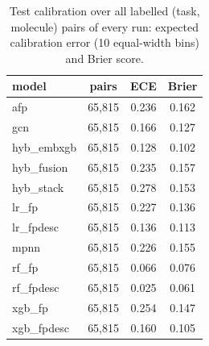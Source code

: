 \begin{table}[t]
\centering
\caption{Test calibration over all labelled (task, molecule) pairs of every run: expected calibration error (10 equal-width bins) and Brier score.}
\label{tab:hybrid-calibration}
\small
\begin{tabular}{lccc}
\toprule
model & pairs & ECE & Brier \\
\midrule
afp & 65,815 & 0.236 & 0.162 \\
gcn & 65,815 & 0.166 & 0.127 \\
hyb\_embxgb & 65,815 & 0.128 & 0.102 \\
hyb\_fusion & 65,815 & 0.235 & 0.157 \\
hyb\_stack & 65,815 & 0.278 & 0.153 \\
lr\_fp & 65,815 & 0.227 & 0.136 \\
lr\_fpdesc & 65,815 & 0.136 & 0.113 \\
mpnn & 65,815 & 0.226 & 0.155 \\
rf\_fp & 65,815 & 0.066 & 0.076 \\
rf\_fpdesc & 65,815 & 0.025 & 0.061 \\
xgb\_fp & 65,815 & 0.254 & 0.147 \\
xgb\_fpdesc & 65,815 & 0.160 & 0.105 \\
\bottomrule
\end{tabular}
\end{table}
